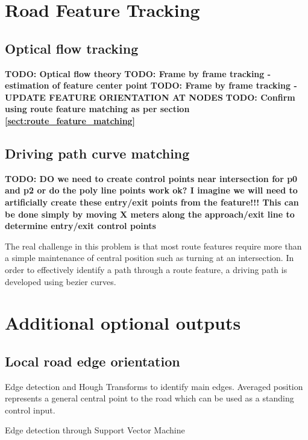 \documentclass[]{aiaa-tc}%
\begin{document}
\section{Road Feature Tracking}

\subsection{Optical flow tracking}
\textbf{TODO: Optical flow theory}
\textbf{TODO: Frame by frame tracking - estimation of feature center point}
\textbf{TODO: Frame by frame tracking - UPDATE FEATURE ORIENTATION AT NODES}
\textbf{TODO: Confirm using route feature matching as per section \ref{sect:route_feature_matching} }

\subsection{Driving path curve matching}

\textbf{TODO: DO we need to create control points near intersection for p0 and p2 or do the poly line points work ok? I imagine we will need to artificially create these entry/exit points from the feature!!! This can be done simply by moving X meters along the approach/exit line to determine entry/exit control points}

The real challenge in this problem is that most route features require more than a simple maintenance of central position such as turning at an intersection. In order to effectively identify a path through a route feature, a driving path is developed using bezier curves.

\section{Additional optional outputs}

\subsection{Local road edge orientation}
Edge detection and Hough Transforms to identify main edges. Averaged position represents a general central point to the road which can be used as a standing control input.

Edge detection through Support Vector Machine \cite{moncularLaneDetectAndTrack}
\end{document}
